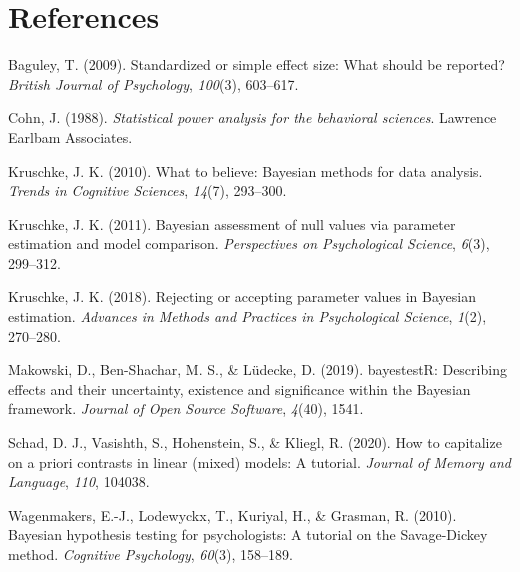 \documentclass[
  english,
  man,floatsintext]{apa7}
\newlength{\cslhangindent}
\newenvironment{cslreferences}%
  {\setlength{\parindent}{0pt}%
  \everypar{\setlength{\hangindent}{\cslhangindent}}\ignorespaces}%
  {\par}
\begin{document}
\newpage

\hypertarget{references}{%
\section{References}\label{references}}

\begingroup
\setlength{\parindent}{-0.5in}
\setlength{\leftskip}{0.5in}

\hypertarget{ref}{}

\endgroup

\hypertarget{refs}{}
\begin{cslreferences}
\leavevmode\hypertarget{ref-baguley2009standardized}{}%
Baguley, T. (2009). Standardized or simple effect size: What should be reported? \emph{British Journal of Psychology}, \emph{100}(3), 603--617.

\leavevmode\hypertarget{ref-cohn1988statistical}{}%
Cohn, J. (1988). \emph{Statistical power analysis for the behavioral sciences}. Lawrence Earlbam Associates.

\leavevmode\hypertarget{ref-kruschke2010believe}{}%
Kruschke, J. K. (2010). What to believe: Bayesian methods for data analysis. \emph{Trends in Cognitive Sciences}, \emph{14}(7), 293--300.

\leavevmode\hypertarget{ref-kruschke2011bayesian}{}%
Kruschke, J. K. (2011). Bayesian assessment of null values via parameter estimation and model comparison. \emph{Perspectives on Psychological Science}, \emph{6}(3), 299--312.

\leavevmode\hypertarget{ref-kruschke2018rejecting}{}%
Kruschke, J. K. (2018). Rejecting or accepting parameter values in Bayesian estimation. \emph{Advances in Methods and Practices in Psychological Science}, \emph{1}(2), 270--280.

\leavevmode\hypertarget{ref-makowski2019bayestestr}{}%
Makowski, D., Ben-Shachar, M. S., \& Lüdecke, D. (2019). bayestestR: Describing effects and their uncertainty, existence and significance within the Bayesian framework. \emph{Journal of Open Source Software}, \emph{4}(40), 1541.

\leavevmode\hypertarget{ref-schad2020capitalize}{}%
Schad, D. J., Vasishth, S., Hohenstein, S., \& Kliegl, R. (2020). How to capitalize on a priori contrasts in linear (mixed) models: A tutorial. \emph{Journal of Memory and Language}, \emph{110}, 104038.

\leavevmode\hypertarget{ref-wagenmakers2010bayesian}{}%
Wagenmakers, E.-J., Lodewyckx, T., Kuriyal, H., \& Grasman, R. (2010). Bayesian hypothesis testing for psychologists: A tutorial on the Savage-Dickey method. \emph{Cognitive Psychology}, \emph{60}(3), 158--189.
\end{cslreferences}
\end{document}
